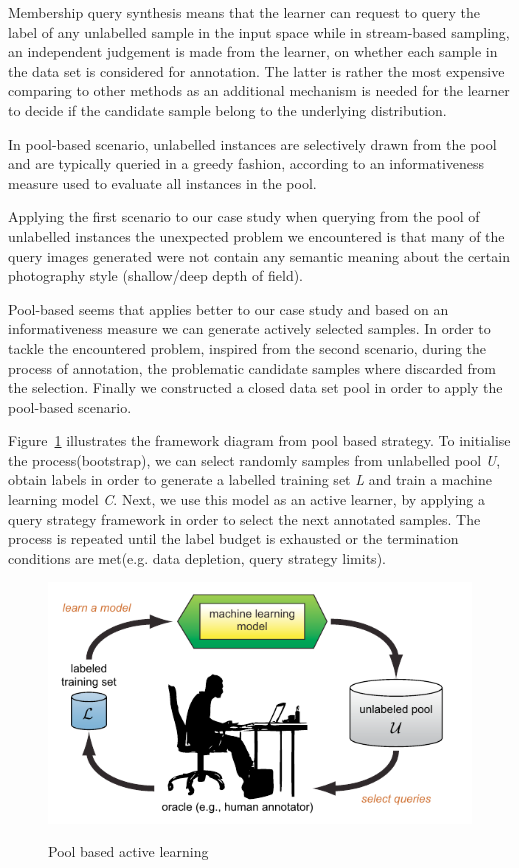 Membership query synthesis means that the learner can request to query the label of any unlabelled sample in the input space while in stream-based sampling, an independent judgement is made from the learner, on whether each sample in the data set is considered for annotation. The latter is rather the most expensive comparing to other methods as an additional mechanism is needed for the learner to decide if the candidate sample belong to the underlying distribution.

In pool-based scenario, unlabelled instances are selectively drawn from the pool and are typically queried in a greedy fashion, according to an informativeness measure used to evaluate all instances in the pool.

Applying the first scenario to our case study when querying from the pool of unlabelled instances the unexpected problem we encountered is that many of the query images generated were not contain any semantic meaning about the certain photography style (shallow/deep depth of field). 

Pool-based seems that applies better to our case study and based on an informativeness measure we can generate actively selected samples. In order to tackle the encountered problem, inspired from the second scenario, during the process of annotation, the problematic candidate samples where discarded from the selection. Finally we constructed a closed data set pool in order to apply the pool-based scenario.

Figure~\ref{c3:fig_pool_based} illustrates the framework diagram from pool based strategy. To initialise the process(bootstrap), we can select randomly samples from unlabelled pool \textit{U}, obtain labels in order to generate a labelled training set \textit{L} and train a machine learning model \textit{C}. Next, we use this model as an active learner, by applying a query strategy framework in order to select the next annotated samples. The process is repeated until the label budget is exhausted or the termination conditions are met(e.g. data depletion, query strategy limits).

\begin{figure}[ht!]
    \centering  
    {\includegraphics[width=.5\textwidth]{figures/chap3/active_learning/pool_based}}
    \caption{Pool based active learning}
    \label{c3:fig_pool_based}
\end{figure} 

